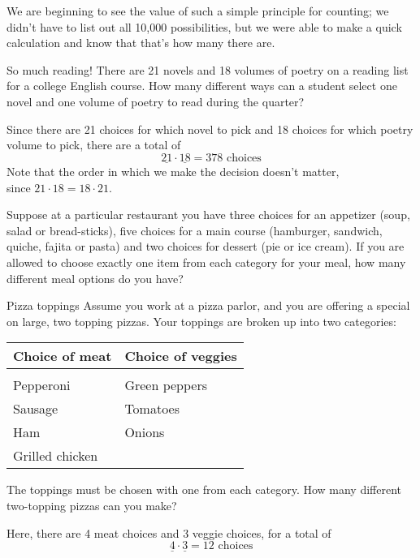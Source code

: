 We are beginning to see the value of such a simple principle for counting; we didn't have to list out all 10,000 possibilities, but we were able to make a quick calculation and know that that's how many there are.

\begin{example}[https://www.youtube.com/watch?v=MhWsP81KJ84]{So much reading!}
There are 21 novels and 18 volumes of poetry on a reading list for a college English course. How many different ways can a student select one novel and one volume of poetry to read during the quarter?

\sol
Since there are 21 choices for which novel to pick and 18 choices for which poetry volume to pick, there are a total of \[\underline{21} \cdot \underline{18} = \boxed{378 \textrm{ choices}}\]
Note that the order in which we make the decision doesn't matter,\\ since $21 \cdot 18 = 18 \cdot 21$.
\end{example}

\begin{try}
Suppose at a particular restaurant you have three choices for an appetizer (soup, salad or bread-sticks), five choices for a main course (hamburger, sandwich, quiche, fajita or pasta) and two choices for dessert (pie or ice cream). If you are allowed to choose exactly one item from each category for your meal, how many different meal options do you have?
\end{try}
\vspace{-0.25in}

\begin{example}[https://www.youtube.com/watch?v=R-yVVNKC0QQ]{Pizza toppings}
Assume you work at a pizza parlor, and you are offering a special on large, two topping pizzas. Your toppings are broken up into two categories:
\begin{center}
\begin{tabular}{l l}
\textbf{Choice of meat} & \textbf{Choice of veggies} \\ \hline
& \\
Pepperoni & Green peppers \\
Sausage & Tomatoes \\
Ham & Onions \\
Grilled chicken & \\ 
\end{tabular} 
\end{center}
The toppings must be chosen with one from each category. How many different two-topping
pizzas can you make?

\sol
Here, there are 4 meat choices and 3 veggie choices, for a total of 
\[\underline{4} \cdot \underline{3} = \boxed{12 \textrm{ choices}}\]
\end{example}

